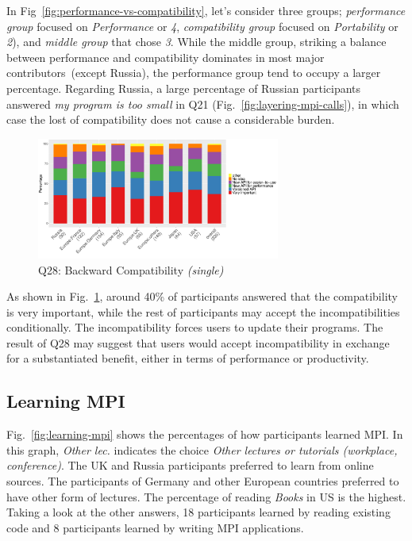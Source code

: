 \documentclass[preprint,5p,times]{elsarticle}
\def\myquote#1{{\it #1}}
\newcommand{\revision}[2]{{\color{blue}#2}}
\def\mcountries{major contributors\xspace{}}%
\begin{document}
In Fig~\ref{fig:performance-vs-compatibility}, let's consider three groups; {\it
performance group} focused on \myquote{Performance} or \myquote{4}, {\it
compatibility group} focused on \myquote{Portability} or \myquote{2}), and {\it
middle group} \revision{who}{that} chose \myquote{3}. While the middle group, striking a balance
between performance and compatibility dominates in most \mcountries\  (\revision{excepting}{except}
Russia), the performance group tend to occupy a larger percentage. Regarding
Russia, a large percentage of Russian participants answered \myquote{my program
is too small} in Q21 (Fig.~\ref{fig:layering-mpi-calls}), in which case the lost
of compatibility does not cause a considerable burden.

\begin{figure}[tb]
\begin{center}
\includegraphics[width=8.0cm]{R-scripts/Q28.pdf}
\vspace{-2mm}
\caption{Q28: Backward Compatibility {\it(single)}}
\label{fig:compatibility}
\end{center}
\end{figure}

As shown in Fig.~\ref{fig:compatibility}, around 40\% of participants answered
that the compatibility is very important, while the rest of participants may
accept the \revision{incompatibility}{incompatibilities} conditionally. The incompatibility forces users to
update their programs. The result of Q28 may \revision{suggests}{suggest} that users would accept
incompatibility in exchange \revision{of}{for} a substantiated benefit, either in terms of
performance or productivity.

\subsection{Learning MPI}\label{sec:learning-mpi}

Fig.~\ref{fig:learning-mpi} shows the percentages of how participants learned
MPI. In this graph, \myquote{Other lec.} indicates the choice \myquote{Other
lectures or tutorials (workplace, conference)}. The UK and Russia participants
preferred to learn from online sources. The participants of Germany and other
European countries preferred to have other form of lectures. The percentage of
reading \myquote{Books} in US is the highest. Taking a look at the other
answers, 18 participants learned by reading existing code and 8 participants
learned by writing MPI applications.
\end{document}
